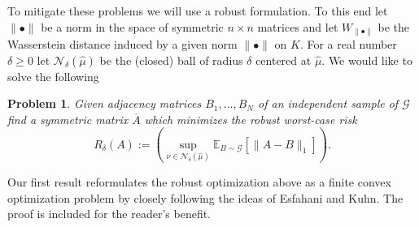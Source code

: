\documentclass[12pt]{amsart}
\newtheorem*{problem*}{Problem}
\theoremstyle{remark}
\newcommand{\EE}{\mathbb{E}}
\newcommand{\grG}{{\mathcal{G}}}
\begin{document}
To mitigate these problems we will use a robust formulation. To this end let $\|\bullet\|$ be a norm in the space of symmetric $n\times n$ matrices and let $W_{\|\bullet\|}$ be the Wasserstein distance induced by a given norm $\|\bullet\|$ on $K$. For a real number $\delta\geq 0$ let $\mathcal{N}_{\delta}(\hat{\mu})$ be the (closed) ball of radius $\delta$ centered at $\hat{\mu}$. We would like to solve the following


\begin{problem*}\label{ProbRobusto2} Given adjacency matrices $B_1,\dots, B_N$ of an independent sample of $\grG$ find a symmetric matrix $\overline{A}$ which minimizes the robust worst-case risk 
\[R_{\delta}(A):=\left(\sup_{\nu\in \mathcal{N}_{\delta}(\hat{\mu})} \EE_{B\sim \grG}[\|A-B\|_1]\right).\] 
\end{problem*}

Our first result reformulates the robust optimization above as a finite convex optimization problem by closely following the ideas of Esfahani and Kuhn. The proof is included for the reader's benefit.
\end{document}
